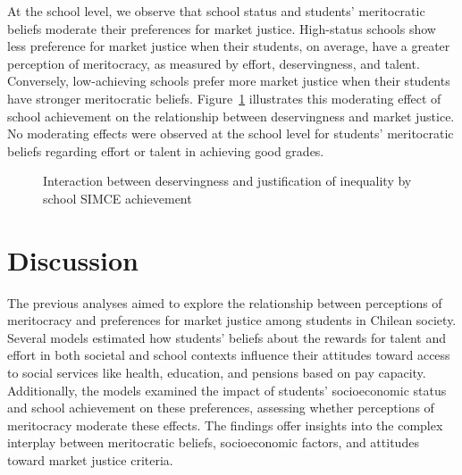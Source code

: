 \documentclass[
  12pt,
  letterpaper,
]{article}
\begin{document}
At the school level, we observe that school status and students'
meritocratic beliefs moderate their preferences for market justice.
High-status schools show less preference for market justice when their
students, on average, have a greater perception of meritocracy, as
measured by effort, deservingness, and talent. Conversely, low-achieving
schools prefer more market justice when their students have stronger
meritocratic beliefs. Figure~\ref{fig-interaction} illustrates this
moderating effect of school achievement on the relationship between
deservingness and market justice. No moderating effects were observed at
the school level for students' meritocratic beliefs regarding effort or
talent in achieving good grades.

\begin{figure}


\caption{\label{fig-interaction}Interaction between deservingness and
justification of inequality by school SIMCE achievement}

\end{figure}%

\section{Discussion}\label{discussion}

The previous analyses aimed to explore the relationship between
perceptions of meritocracy and preferences for market justice among
students in Chilean society. Several models estimated how students'
beliefs about the rewards for talent and effort in both societal and
school contexts influence their attitudes toward access to social
services like health, education, and pensions based on pay capacity.
Additionally, the models examined the impact of students' socioeconomic
status and school achievement on these preferences, assessing whether
perceptions of meritocracy moderate these effects. The findings offer
insights into the complex interplay between meritocratic beliefs,
socioeconomic factors, and attitudes toward market justice criteria.
\end{document}
